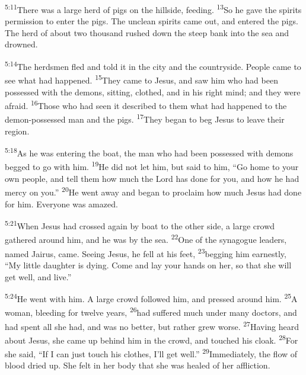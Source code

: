 \documentclass[openany,12pt,english]{book}
\newenvironment{para}{\par\pretolerance=100\tolerance=200\setlength{\emergencystretch}{0.6em}\relax}{\par}
\begin{document}
\begin{para}
    \textsuperscript{5:11}\thinspace{}There was a large herd of pigs on the hill\-side, feed\-ing.
    \textsuperscript{13}\thinspace{}So he gave the spirits per\-mis\-sion to en\-ter the pigs. The un\-clean spirits came out, and entered the pigs. The herd of a\-bout two thou\-sand rushed down the steep bank in\-to the sea and drowned.
\end{para}

\begin{para}
    \textsuperscript{5:14}\thinspace{}The herdsmen fled and told it in the cit\-y and the coun\-try\-side. Peo\-ple came to see what had happened.
    \textsuperscript{15}\thinspace{}They came to Jesus, and saw him who had been pos\-sessed with the demons, sit\-ting, clothed, and in his right mind; and they were a\-fraid.
    \textsuperscript{16}\thinspace{}Those who had seen it de\-scribed to them what had happened to the demon-possessed man and the pigs.
    \textsuperscript{17}\thinspace{}They be\-gan to beg Jesus to leave their re\-gion.
\end{para}

\begin{para}
    \textsuperscript{5:18}\thinspace{}As he was entering the boat, the man who had been pos\-sessed with demons begged to go with him.
    \textsuperscript{19}\thinspace{}He did not let him, but said to him, “Go home to your own peo\-ple, and tell them how much the Lord has done for you, and how he had mer\-cy on you.”
    \textsuperscript{20}\thinspace{}He went a\-way and be\-gan to pro\-claim how much Jesus had done for him. Eve\-ry\-one was a\-mazed.
\end{para}

\bigskip{}

\begin{para}
    \textsuperscript{5:21}\thinspace{}When Jesus had crossed a\-gain by boat to the oth\-er side, a large crowd gathered a\-round him, and he was by the sea.
    \textsuperscript{22}\thinspace{}One of the syn\-a\-gogue leaders, named Jairus, came. See\-ing Jesus, he fell at his feet,
    \textsuperscript{23}\thinspace{}begging him ear\-nest\-ly, “My lit\-tle daugh\-ter is dy\-ing. Come and lay your hands on her, so that she will get well, and live.”
\end{para}

\begin{para}
    \textsuperscript{5:24}\thinspace{}He went with him. A large crowd followed him, and pressed a\-round him.
    \textsuperscript{25}\thinspace{}A wom\-an, bleed\-ing for twelve years,
    \textsuperscript{26}\thinspace{}had suffered much un\-der man\-y doctors, and had spent all she had, and was no bet\-ter, but rath\-er grew worse.
    \textsuperscript{27}\thinspace{}Hav\-ing heard a\-bout Jesus, she came up be\-hind him in the crowd, and touched his cloak.
    \textsuperscript{28}\thinspace{}For she said, “If I can just tou\-ch his clothes, I'll get well.”
    \textsuperscript{29}\thinspace{}Im\-me\-di\-ate\-ly, the flow of blood dried up. She felt in her bod\-y that she was healed of her af\-flic\-tion.
\end{para}
\end{document}
